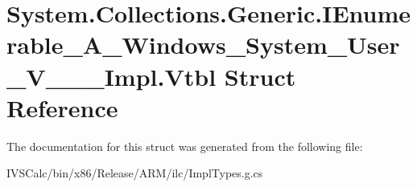 \hypertarget{struct_system_1_1_collections_1_1_generic_1_1_i_enumerable___a___windows___system___user___v_______impl_1_1_vtbl}{}\section{System.\+Collections.\+Generic.\+I\+Enumerable\+\_\+\+A\+\_\+\+Windows\+\_\+\+System\+\_\+\+User\+\_\+\+V\+\_\+\+\_\+\+\_\+\+Impl.\+Vtbl Struct Reference}
\label{struct_system_1_1_collections_1_1_generic_1_1_i_enumerable___a___windows___system___user___v_______impl_1_1_vtbl}


The documentation for this struct was generated from the following file\+:\begin{DoxyCompactItemize}
\item 
I\+V\+S\+Calc/bin/x86/\+Release/\+A\+R\+M/ilc/Impl\+Types.\+g.\+cs\end{DoxyCompactItemize}
